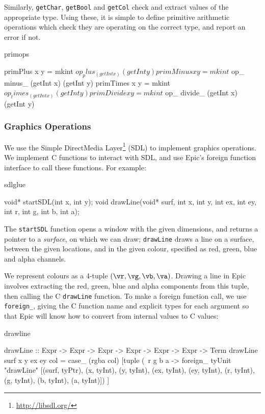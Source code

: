 \noindent
Similarly, \texttt{getChar}, \texttt{getBool} and \texttt{getCol}
check and extract values of the appropriate type.
Using these, it is simple to define primitive arithmetic operations
which check they are operating on the correct type, and report an
error if not.

\begin{SaveVerbatim}{primops}

primPlus   x y = mkint $ op_ plus_   (getInt x) (getInt y)
primMinus  x y = mkint $ op_ minus_  (getInt x) (getInt y)
primTimes  x y = mkint $ op_ times_  (getInt x) (getInt y)
primDivide x y = mkint $ op_ divide_ (getInt x) (getInt y)
\end{SaveVerbatim}

\subsubsection{Graphics Operations}

We use the Simple DirectMedia Layer\footnote{\url{http://libsdl.org/}}
(SDL) to implement graphics operations. We implement C functions to
interact with SDL, and use Epic's foreign function interface to
call these functions. For example:

\begin{SaveVerbatim}{sdlglue}

void* startSDL(int x, int y);
void  drawLine(void* surf, int x, int y, int ex, int ey,
                           int r, int g, int b, int a);

\end{SaveVerbatim}

\noindent
The \texttt{startSDL} function opens a window with the given
dimensions, and returns a pointer to a \emph{surface}, on which we can
draw; \texttt{drawLine} draws a line on a surface, between the given
locations, and in the given colour, specified as red, green, blue and
alpha channels.

We represent colours as a 4-tuple $(\vr,\vg,\vb,\va)$.  Drawing a line
in Epic involves extracting the red, green, blue and alpha components
from this tuple, then calling the C \texttt{drawLine} function. To
make a foreign function call, we use \texttt{foreign\_}, giving the C
function name and explicit types for each argument so that Epic
will know how to convert from internal values to C values:

\begin{SaveVerbatim}{drawline}

drawLine :: Expr -> Expr -> Expr -> Expr -> Expr -> Expr -> Term
drawLine surf x y ex ey col
    = case_ (rgba col)
        [tuple (\ r g b a ->
           foreign_ tyUnit "drawLine" 
             [(surf, tyPtr),
              (x, tyInt), (y, tyInt), (ex, tyInt), (ey, tyInt),
              (r, tyInt), (g, tyInt), (b, tyInt), (a, tyInt)]) ]

\end{SaveVerbatim}

